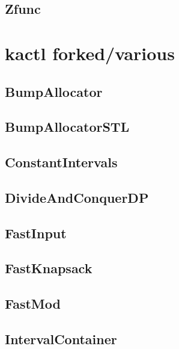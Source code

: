 \subsection{Zfunc}
\raggedbottom
\hrulefill

\section{kactl forked/various}
\subsection{BumpAllocator}
\raggedbottom
\hrulefill
\subsection{BumpAllocatorSTL}
\raggedbottom
\hrulefill
\subsection{ConstantIntervals}
\raggedbottom
\hrulefill
\subsection{DivideAndConquerDP}
\raggedbottom
\hrulefill
\subsection{FastInput}
\raggedbottom
\hrulefill
\subsection{FastKnapsack}
\raggedbottom
\hrulefill
\subsection{FastMod}
\raggedbottom
\hrulefill
\subsection{IntervalContainer}
\raggedbottom
\hrulefill
